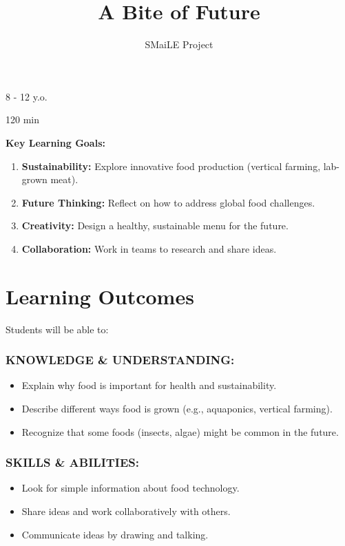 \documentclass[11pt, a4paper]{article}
\begin{document}
\title{\textbf{\color{SmaileGreen}A Bite of Future}}
\author{SMaiLE Project}
\date{}
\maketitle
\thispagestyle{plain}

\begin{keyinfobox}
    \begin{description}[leftmargin=*, labelindent=0pt]
        \item[\bfseries\color{SmaileGreen} Target Group:] 8 - 12 y.o.
        \item[\bfseries\color{SmaileGreen} Duration:] 120 min
    \end{description}
    \textbf{Key Learning Goals:}
    \begin{enumerate}
        \item \textbf{Sustainability:} Explore innovative food production (vertical farming, lab-grown meat).
        \item \textbf{Future Thinking:} Reflect on how to address global food challenges.
        \item \textbf{Creativity:} Design a healthy, sustainable menu for the future.
        \item \textbf{Collaboration:} Work in teams to research and share ideas.
    \end{enumerate}
\end{keyinfobox}

\section*{Learning Outcomes}
Students will be able to:

\subsubsection*{KNOWLEDGE \& UNDERSTANDING:}
\begin{itemize}
    \item Explain why food is important for health and sustainability.
    \item Describe different ways food is grown (e.g., aquaponics, vertical farming).
    \item Recognize that some foods (insects, algae) might be common in the future.
\end{itemize}

\subsubsection*{SKILLS \& ABILITIES:}
\begin{itemize}
    \item Look for simple information about food technology.
    \item Share ideas and work collaboratively with others.
    \item Communicate ideas by drawing and talking.
\end{itemize}
\end{document}
